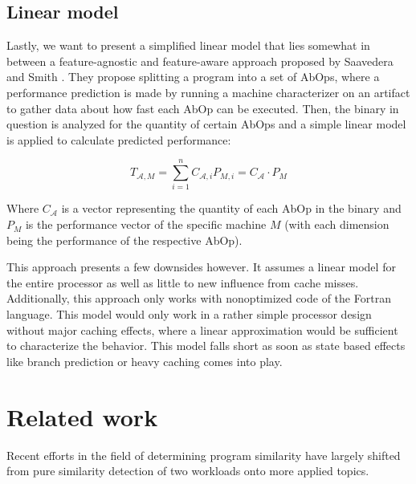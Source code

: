 \documentclass[../bachelor_paper.tex]{subfiles}
\begin{document}
\subsection{Linear model}
Lastly, we want to present a simplified linear model that lies somewhat in between a feature-agnostic and feature-aware approach proposed by Saavedera and Smith \cite{saavedraAnalysisBenchmarkCharacteristics1996}. They propose splitting a program into a set of \acp{AbOp}, where a performance prediction is made by running a machine characterizer on an artifact to gather data about how fast each \ac{AbOp} can be executed. Then, the binary in question is analyzed for the quantity of certain \acp{AbOp} and a simple linear model is applied to calculate predicted performance:

\begin{equation}
\label{eq:theo/simi/hybr/mode}
T_{\mathcal{A},M} = \sum^n_{i = 1}C_{\mathcal{A},i}P_{M,i} = C_\mathcal{A} \cdot P_M
\end{equation}

Where $C_{\mathcal{A}}$ is a vector representing the quantity of each \ac{AbOp} in the binary and $P_{M}$ is the performance vector of the specific machine $M$ (with each dimension being the performance of the respective \ac{AbOp}).

This approach presents a few downsides however. It assumes a linear model for the entire processor as well as little to new influence from cache misses. Additionally, this approach only works with nonoptimized code of the Fortran language. This model would only work in a rather simple processor design without major caching effects, where a linear approximation would be sufficient to characterize the behavior. This model falls short as soon as state based effects like branch prediction or heavy caching comes into play.

\section{Related work}
	\label{sec:prob/rel}

Recent efforts in the field of determining program similarity have largely shifted from pure similarity detection of two workloads onto more applied topics. 
\end{document}

